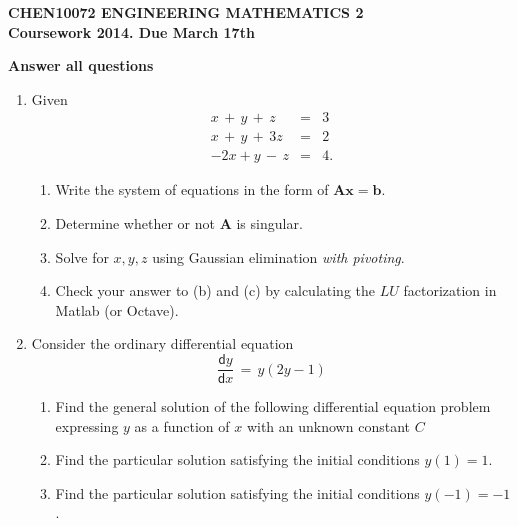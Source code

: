 \documentclass[12pt]{article}
\def\bA{\mathbf{A}}
\newcommand{\dif}{\mathsf{d}}
\begin{document}
\begin{center}{\bf\large
CHEN10072 ENGINEERING MATHEMATICS 2
\\
Coursework 2014. Due March 17th
}
\end{center}
\begin{center}{\bf
Answer all questions
}
\end{center}

\begin{enumerate}

\item 
Given
\vspace{-0.5cm}
\begin{eqnarray*}
x\,+\,y\,+\,z&=&3\\
x\,+\,y\,+\,3z&=&2\\
-2x + y\,-\,z&=&4 .
\end{eqnarray*}
            \begin{enumerate}
            \item Write the system of  equations in the form of $\bA \mathbf{x}=\mathbf{b}$.
            \item\label{q1207b}  Determine whether or not {\bf A} is singular.  
            \item  Solve for $x,y,z$ using Gaussian elimination {\em with pivoting}.
            \item Check your answer to (b) and (c) by calculating the $LU$ factorization in Matlab (or Octave).
    \end{enumerate}
	

\item
Consider the ordinary differential equation
$$ \frac{\dif y}{\dif x}\,=\,  y(2y-1) $$
\begin{enumerate}
\item
Find the general solution of the following differential equation problem expressing $y$  as a function of $x$ with an unknown constant $C$
\item Find the particular solution satisfying the initial conditions $y(1)=1$. 
\item Find the particular solution satisfying the initial conditions $y(-1)=-1$. 
\end{enumerate}



\end{enumerate}
\end{document}
